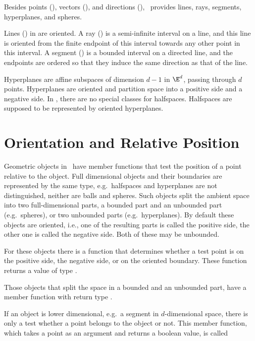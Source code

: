 Besides points (), vectors (), and
directions (), \cgal\ provides lines, rays,
segments, hyperplanes, and spheres.

Lines () in {\cgal} are oriented.  A ray
() is a semi-infinite interval on a line, and this line
is oriented from the finite endpoint of this interval towards any
other point in this interval. A segment () is a
bounded interval on a directed line, and the endpoints are ordered so
that they induce the same direction as that of the line.

Hyperplanes are affine subspaces of dimension $d-1$ in $\E^d$, passing
through $d$ points.  Hyperplanes are oriented and partition space into
a positive side and a negative side.  In \cgal, there are no special
classes for halfspaces.  Halfspaces are supposed to be represented by
oriented hyperplanes.

\section{Orientation and Relative Position}

Geometric objects in \cgal\ have member functions that test the
position of a point relative to the object.  Full dimensional objects
and their boundaries are represented by the same type, e.g.\ 
halfspaces and hyperplanes are not distinguished, neither are balls
and spheres. Such objects split the ambient space into two
full-dimensional parts, a bounded part and an unbounded part (e.g.\ 
spheres), or two unbounded parts (e.g.\ hyperplanes). By default these
objects are oriented, i.e., one of the resulting parts is called the
positive side, the other one is called the negative side. Both of
these may be unbounded.

For these objects there is a function  that
determines whether a test point is on the positive side, the negative
side, or on the oriented boundary. These function returns a value of
type \ccc{Oriented_side}.

Those objects that split the space in a bounded and an unbounded part,
have a member function  with return type
\ccc{Bounded_side}.

If an object is lower dimensional, e.g.\ a segment in $d$-dimensional
space, there is only a test whether a point belongs to the object or
not. This member function, which takes a point as an argument and
returns a boolean value, is called \ccStyle{has_on()}

